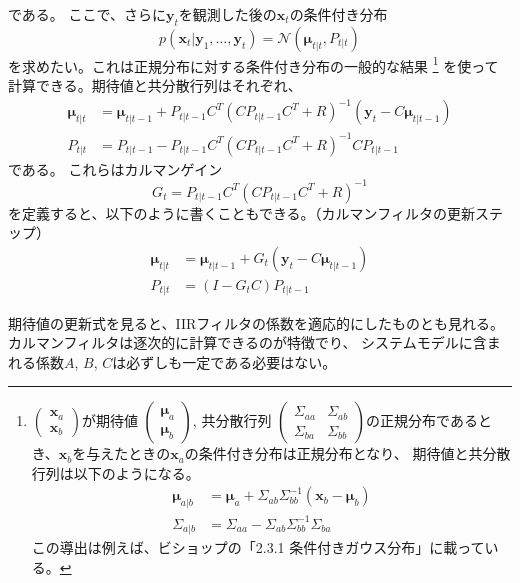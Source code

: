 \documentclass[textwidth-limit=45]{bxjsarticle}
\begin{document}
である。
ここで、さらに$\bm y_t$を観測した後の$\bm x_t$の条件付き分布
\begin{equation}
  p(\bm x_{t}|\bm y_1, \dots, \bm y_{t}) = \mathcal N(\bm \mu_{t|t}, P_{t|t})
\end{equation}
を求めたい。これは正規分布に対する条件付き分布の一般的な結果
\footnote{
  $\begin{pmatrix}
    \bm x_{a} \\
    \bm x_{b}
  \end{pmatrix}
  $が期待値
  $\begin{pmatrix}
    \bm \mu_{a} \\
    \bm \mu_{b}
  \end{pmatrix}
  $, 共分散行列
  $\begin{pmatrix}
    \Sigma_{aa} & \Sigma_{ab} \\
    \Sigma_{ba} & \Sigma_{bb}
  \end{pmatrix}
  $の正規分布であるとき、$\bm x_b$を与えたときの$\bm x_a$の条件付き分布は正規分布となり、
  期待値と共分散行列は以下のようになる。
  \begin{align}
    \bm \mu_{a|b} &= \bm \mu_{a} + \Sigma_{ab} \Sigma_{bb}^{-1} (\bm x_b - \bm \mu_{b}) \\
    \Sigma_{a|b} &= \Sigma_{aa} - \Sigma_{ab} \Sigma_{bb}^{-1} \Sigma_{ba}
  \end{align}
  この導出は例えば、ビショップの「2.3.1 条件付きガウス分布」に載っている。
}
を使って計算できる。期待値と共分散行列はそれぞれ、
\begin{align}
  \bm \mu_{t|t} &= \bm \mu_{t|t-1} + P_{t|t-1}C^T (C P_{t|t-1} C^T + R)^{-1} (\bm y_t - C\bm \mu_{t|t-1})  \\
  P_{t|t} &= P_{t|t-1} - P_{t|t-1} C^T (C P_{t|t-1} C^T + R)^{-1} C P_{t|t-1}
\end{align}
である。
これらはカルマンゲイン
\begin{equation}
  G_t = P_{t|t-1} C^T (C P_{t|t-1} C^T + R)^{-1}
\end{equation}
を定義すると、以下のように書くこともできる。（カルマンフィルタの更新ステップ）
\begin{align}
  \bm \mu_{t|t} &= \bm \mu_{t|t-1} + G_t (\bm y_t - C\bm \mu_{t|t-1})  \\
  P_{t|t} &= (I- G_t C) P_{t|t-1}
\end{align}

期待値の更新式を見ると、IIRフィルタの係数を適応的にしたものとも見れる。
カルマンフィルタは逐次的に計算できるのが特徴でり、
システムモデルに含まれる係数$A$, $B$, $C$は必ずしも一定である必要はない。
\end{document}
